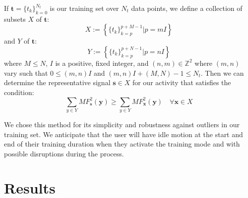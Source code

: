 \documentclass[journal]{IEEEtran}
\begin{document}
If $\textbf{t} = \{t_k\}_{k=0}^{N_t}$ is our training set over $N_t$ data points, we define a collection of subsets $X$ of $\textbf{t}$:
%
\begin{equation} \label{X_subsets_of_training_eq}
X := \left \{ \{t_k\}_{k=p}^{p+M-1} | p=mI \right \}
\end{equation}
%
and $Y$ of $\textbf{t}$:
%
\begin{equation} \label{Y_subsets_of_training_eq}
Y := \left \{ \{t_k\}_{k=p}^{p+N-1} | p=nI \right \}
\end{equation}
%
where $M \leq N$, $I$ is a positive, fixed integer, and $(n,m) \in \mathbb{Z}^2$ where $(m,n)$ vary such that $0 \leq (m,n)I$ and $(m,n)I + (M,N) - 1 \leq N_t$. Then we can determine the representative signal $\textbf{s} \in X$ for our activity that satisfies the condition:
%
\begin{equation} \label{s_condition}
\sum_{y \in Y}MF^2_{\textbf{s}}(\textbf{y}) \geq \sum_{y \in Y}MF^2_{\textbf{x}}(\textbf{y}) \quad \forall \textbf{x} \in X
\end{equation}

We chose this method for its simplicity and robustness against outliers in our training set. We anticipate that the user will have idle motion at the start and end of their training duration when they activate the training mode and with possible disruptions during the process.
%
\section{Results}
%
\end{document}
